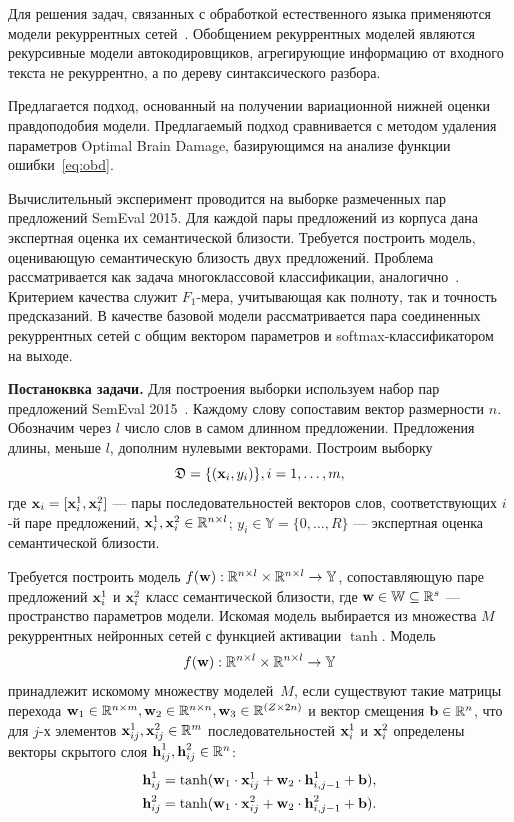 Для решения задач, связанных с обработкой естественного языка применяются модели рекуррентных сетей~\cite{siamese}. Обобщением рекуррентных моделей являются рекурсивные модели автокодировщиков, агрегирующие информацию от  входного текста не рекуррентно, а по дереву синтаксического разбора.

Предлагается подход, основанный на получении вариационной нижней оценки правдоподобия модели. Предлагаемый подход сравнивается с методом удаления параметров Optimal Brain Damage, базирующимся на анализе функции ошибки~\eqref{eq:obd}. 

Вычислительный эксперимент проводится на выборке размеченных пар предложений SemEval 2015. Для каждой пары предложений из корпуса дана экспертная оценка их семантической близости. Требуется построить модель, оценивающую семантическую близость двух предложений. Проблема рассматривается как задача многоклассовой классификации, аналогично~\cite{sanborn}. Критерием качества служит $F_1$-мера, учитывающая как полноту, так и точность предсказаний.
В качестве базовой модели рассматривается пара соединенных рекуррентных сетей с общим вектором параметров и softmax-классификатором на выходе.

\textbf{Постаноквка задачи. }
Для построения выборки используем набор пар предложений SemEval 2015~\cite{semeval2015}.
Каждому слову сопоставим вектор размерности $n$.
Обозначим через $l$ число слов в самом длинном предложении. Предложения длины, меньше $l$, дополним нулевыми векторами. 
Построим выборку
$$ {\mathfrak{D}} = \{({\textbf{x}}_i,y_i)\}, i = 1,\dots,m,$$
где ${\textbf{x}}_i = [{\textbf{x}}_i^1,{\textbf{x}}_i^2]$ --- пары последовательностей векторов слов, соответствующих $i$-й паре предложений, ${\textbf{x}}_i^1, {\textbf{x}}_i^2 \in \mathbb{R}^{n\times l}$;
$y_i \in \mathbb{Y} = \{0,\dots,R\}$ --- экспертная оценка семантической близости. 

Требуется построить модель $f({\textbf{w}}): \mathbb{R}^{n\times l} \times \mathbb{R}^{n\times l} \to \mathbb{Y}$, сопоставляющую паре предложений ${\textbf{x}}_i^1$ и ${\textbf{x}}_i^2$ класс семантической близости, где ${\textbf{w}} \in {\mathbb{W}}\subseteq\mathbb{R}^s$ --- пространство параметров модели.
Искомая модель выбирается из множества $M$ рекуррентных нейронных сетей с функцией активации $\tanh$. Модель 
\[
f({\textbf{w}}): \mathbb{R}^{n\times l} \times \mathbb{R}^{n\times l} \to \mathbb{Y}
\]
принадлежит искомому множеству моделей~$M$, если существуют такие матрицы перехода $\mathbf{w}_1\in \mathbb{R}^{n\times m}, \mathbf{w}_2\in \mathbb{R}^{n\times n}, \mathbf{w}_3\in \mathbb{R}^{(Z \times 2n)}$ и вектор смещения ${\mathbf{b}} \in \mathbb{R}^{n}$, что для $j$-х элементов ${\textbf{x}}_{ij}^1, {\textbf{x}}_{ij}^2 \in \mathbb{R}^m$ последовательностей ${\textbf{x}}_i^1$ и ${\textbf{x}}_i^2$ определены векторы скрытого слоя ${\textbf{h}}_{ij}^1, {\textbf{h}}_{ij}^2 \in \mathbb{R}^{n}$:
\begin{gather}
{\textbf{h}}_{ij}^1 = \tanh(\mathbf{w}_1\cdot {\textbf{x}}_{ij}^1 + \mathbf{w}_2\cdot {\textbf{h}}_{i,j-1}^1 + {\mathbf{b}}),\\
{\textbf{h}}_{ij}^2 = \tanh(\mathbf{w}_1\cdot {\textbf{x}}_{ij}^2 + \mathbf{w}_2\cdot {\textbf{h}}_{i,j-1}^2 + {\mathbf{b}}).
\end{gather}

